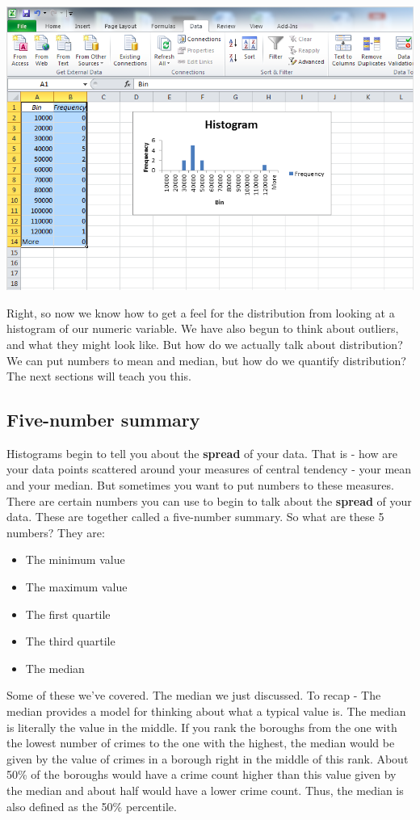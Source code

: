 \documentclass[
]{book}
\providecommand{\tightlist}{%
  \setlength{\itemsep}{0pt}\setlength{\parskip}{0pt}}
\begin{document}
\includegraphics{imgs/hist_appears.png}

Right, so now we know how to get a feel for the distribution from looking at a histogram of our numeric variable. We have also begun to think about outliers, and what they might look like. But how do we actually talk about distribution? We can put numbers to mean and median, but how do we quantify distribution? The next sections will teach you this.

\hypertarget{five-number-summary}{%
\subsection{Five-number summary}\label{five-number-summary}}

Histograms begin to tell you about the \textbf{spread} of your data. That is - how are your data points scattered around your measures of central tendency - your mean and your median. But sometimes you want to put numbers to these measures. There are certain numbers you can use to begin to talk about the \textbf{spread} of your data. These are together called a five-number summary. So what are these 5 numbers? They are:

\begin{itemize}
\tightlist
\item
  The minimum value
\item
  The maximum value
\item
  The first quartile
\item
  The third quartile
\item
  The median
\end{itemize}

Some of these we've covered. The median we just discussed. To recap - The median provides a model for thinking about what a typical value is. The median is literally the value in the middle. If you rank the boroughs from the one with the lowest number of crimes to the one with the highest, the median would be given by the value of crimes in a borough right in the middle of this rank. About 50\% of the boroughs would have a crime count higher than this value given by the median and about half would have a lower crime count. Thus, the median is also defined as the 50\% percentile.
\end{document}
